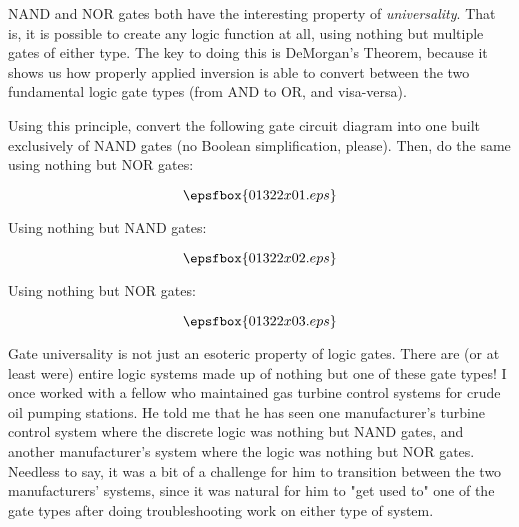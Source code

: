 

NAND and NOR gates both have the interesting property of {\it universality}.  That is, it is possible to create any logic function at all, using nothing but multiple gates of either type.  The key to doing this is DeMorgan's Theorem, because it shows us how properly applied inversion is able to convert between the two fundamental logic gate types (from AND to OR, and visa-versa).

Using this principle, convert the following gate circuit diagram into one built exclusively of NAND gates (no Boolean simplification, please).  Then, do the same using nothing but NOR gates:

\vskip 10pt

$$\epsfbox{01322x01.eps}$$

\vskip 60pt







Using nothing but NAND gates:

$$\epsfbox{01322x02.eps}$$

\vskip 10pt

Using nothing but NOR gates:

$$\epsfbox{01322x03.eps}$$







Gate universality is not just an esoteric property of logic gates.  There are (or at least were) entire logic systems made up of nothing but one of these gate types!  I once worked with a fellow who maintained gas turbine control systems for crude oil pumping stations.  He told me that he has seen one manufacturer's turbine control system where the discrete logic was nothing but NAND gates, and another manufacturer's system where the logic was nothing but NOR gates.  Needless to say, it was a bit of a challenge for him to transition between the two manufacturers' systems, since it was natural for him to "get used to" one of the gate types after doing troubleshooting work on either type of system.




